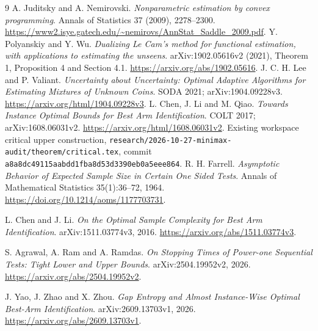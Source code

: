 \documentclass[11pt]{article}
\begin{document}
\begin{thebibliography}{9}
 A. Juditsky and A. Nemirovski.
\emph{Nonparametric estimation by convex programming}.
Annals of Statistics 37 (2009), 2278--2300.
\url{https://www2.isye.gatech.edu/~nemirovs/AnnStat_Saddle_2009.pdf}.
 Y. Polyanskiy and Y. Wu.
\emph{Dualizing Le Cam's method for functional estimation, with applications
to estimating the unseens}. arXiv:1902.05616v2 (2021), Theorem 1,
Proposition 4 and Section 4.1.
\url{https://arxiv.org/abs/1902.05616}.
 J. C. H. Lee and P. Valiant.
\emph{Uncertainty about Uncertainty: Optimal Adaptive Algorithms for
Estimating Mixtures of Unknown Coins}. SODA 2021; arXiv:1904.09228v3.
\url{https://arxiv.org/html/1904.09228v3}.
 L. Chen, J. Li and M. Qiao.
\emph{Towards Instance Optimal Bounds for Best Arm Identification}.
COLT 2017; arXiv:1608.06031v2.
\url{https://arxiv.org/html/1608.06031v2}.
 Existing workspace critical upper construction,
\nolinkurl{research/2026-10-27-minimax-audit/theorem/critical.tex},
commit \nolinkurl{a8a8dc49115aabdd1fba8d53d3390eb0a5eee864}.
 R. H. Farrell.
\emph{Asymptotic Behavior of Expected Sample Size in Certain One Sided Tests}.
Annals of Mathematical Statistics 35(1):36--72, 1964.
\url{https://doi.org/10.1214/aoms/1177703731}.

 L. Chen and J. Li.
\emph{On the Optimal Sample Complexity for Best Arm Identification}.
arXiv:1511.03774v3, 2016.
\url{https://arxiv.org/abs/1511.03774v3}.

 S. Agrawal, A. Ram and A. Ramdas.
\emph{On Stopping Times of Power-one Sequential Tests: Tight Lower and Upper Bounds}.
arXiv:2504.19952v2, 2026.
\url{https://arxiv.org/abs/2504.19952v2}.

 J. Yao, J. Zhao and X. Zhou.
\emph{Gap Entropy and Almost Instance-Wise Optimal Best-Arm Identification}.
arXiv:2609.13703v1, 2026.
\url{https://arxiv.org/abs/2609.13703v1}.

\end{thebibliography}
\end{document}

